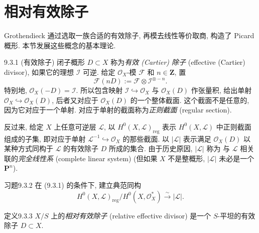 \section{相对有效除子}
\label{ch09s03:section}
\begingroup
\def\L{\mathcal L}\def\N{\mathcal N}\def\M{\mathcal M}
\def\I{\mathcal I}\def\Q{\mathcal Q}\def\F{\mathcal F}
\def\sHom{\mathcal H\!om}
\def\DivF{\Div_{X/S}}\def\DivS{\mathbf{Div}_{X/S}}
\def\HilbS{\mathbf{Hilb}_{X/S}}
\def\LS{\operatorname{LinSys}_{\L/X/S}}

Grothendieck 通过选取一族合适的有效除子, 再模去线性等价取商, 构造了 Picard 概形. 本节发展这些概念的基本理论.

\begin{origstatement}{}{9.3.1 (有效除子)}\label{ch09s03:item931}
闭子概形 $D\subset X$ 称为\emph{有效 (Cartier) 除子} (effective (Cartier) divisor), 如果它的理想 $\I$ 可逆. 给定 $\mathcal O_X$-模 $\F$ 和 $n\in\mathbf Z$, 置
\[
\F(nD):=\F\otimes\I^{\otimes-n}.
\]
特别地, $\mathcal O_X(-D)=\I$. 所以包含映射 $\I\hookrightarrow\mathcal O_X$ 与 $\mathcal O_X(D)$ 作张量积, 给出单射 $\mathcal O_X\hookrightarrow\mathcal O_X(D)$, 后者又对应于 $\mathcal O_X(D)$ 的一个整体截面. 这个截面不是任意的, 因为它对应于一个单射. 对应于单射的截面称为\emph{正则截面} (regular section).

反过来, 给定 $X$ 上任意可逆层 $\L$, 以 $H^0(X,\L)_{\mathrm{reg}}$ 表示 $H^0(X,\L)$ 中正则截面组成的子集, 即对应于单射 $\L^{-1}\hookrightarrow\mathcal O_X$ 的那些截面. 以 $|\L|$ 表示满足 $\mathcal O_X(D)$ 以某种方式同构于 $\L$ 的有效除子 $D$ 所成的集合. 由于历史原因, $|\L|$ 称为
与 $\L$ 相关联的\emph{完全线性系} (complete linear system) (但如果 $X$ 不是整概形, $|\L|$ 未必是一个 $\mathbf P^n$).
\end{origstatement}

\begin{origstatement}{习题}{9.3.2}\label{ch09s03:ex932}
在 (9.3.1) 的条件下, 建立典范同构
\[
H^0(X,\L)_{\mathrm{reg}}/H^0(X,\mathcal O_X^*)\xrightarrow{\sim}|\L|.
\]
\end{origstatement}

\begin{origstatement}{定义}{9.3.3}\label{ch09s03:def933}
$X/S$ 上的\emph{相对有效除子} (relative effective divisor) 是一个 $S$-平坦的有效除子 $D\subset X$.
\end{origstatement}

